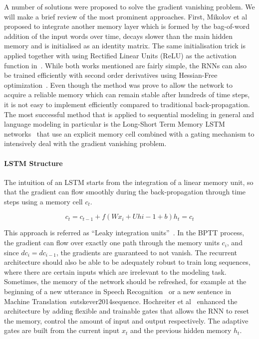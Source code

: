 A number of solutions were proposed to solve the gradient vanishing problem. We will make a brief review of the most prominent approaches. First, Mikolov et al~\cite{mikolov2014learning} proposed to integrate another memory layer which is formed by the bag-of-word addition of the input words over time, decays slower than the main hidden memory and is initialised as an identity matrix. The same initialisation trick is applied together with using Rectified Linear Units (ReLU) as the activation function in~\cite{le2015simple}. While both works mentioned are fairly simple, the RNNs can also be trained efficiently with second order derivatives using Hessian-Free optimization~\cite{martens2011learning}. Even though the method was prove to allow the network to acquire a reliable memory which can remain stable after hundreds of time steps, it is not easy to implement efficiently compared to traditional back-propagation. The most successful method that is applied to sequential modeling in general and language modeling in particular is the Long-Short Term Memory LSTM networks~\cite{hochreiter1997long} that use an explicit memory cell combined with a gating mechanism to intensively deal with the gradient vanishing problem.

\paragraph{LSTM Structure} The intuition of an LSTM starts from the integration of a linear memory unit, so that the gradient can flow smoothly during the back-propagation through time steps using a memory cell $c_t$. 

\begin{equation}
c_t = c_{t-1} + f(Wx_i +  Uh{i-1} + b)
h_t = c_t
\end{equation}

This approach is referred as ``Leaky integration units''~\cite{bengio2013advances}. In the BPTT process, the gradient can flow over exactly one path through the memory units $c_i$, and since $dc_i = dc_{i-1}$, the gradients are guaranteed to not vanish. The recurrent architecture should also be able to be adequately robust to train long sequences, where there are certain inputs which are irrelevant to the modeling task. Sometimes, the memory of the network should be refreshed, for example at the beginning of a new utterance in Speech Recognition~\cite{graves2005framewise} or a new sentence in Machine Translation~{sutskever2014sequence}. Hochreiter et al~\cite{hochreiter1997long} enhanced the architecture by adding flexible and trainable gates that allows the RNN to reset the memory, control the amount of input and output respectively. The adaptive gates are built from the current input $x_t$ and the previous hidden memory $h_t$. 

